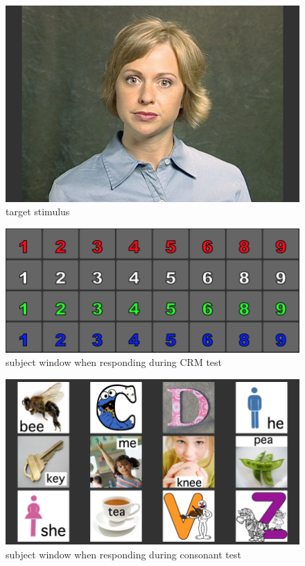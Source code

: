 \documentclass[11pt,pdftex,letterpaper]{article}
\begin{document}
\begin{figure}
\centering
\includegraphics[width = 0.9\linewidth]{target-stimulus.png}
\caption{target stimulus}
\label{fig:target-stimulus}
\end{figure}

\begin{figure}
\centering
\includegraphics[width = 0.9\linewidth]{coordinate-response-window.png}
\caption{subject window when responding during CRM test}
\label{fig:coordinate-response-window}
\end{figure}

\begin{figure}
\centering
\includegraphics[width = 0.9\linewidth]{consonant-response-window.png}
\caption{subject window when responding during consonant test}
\label{fig:consonant-response-window}
\end{figure}
\end{document}
